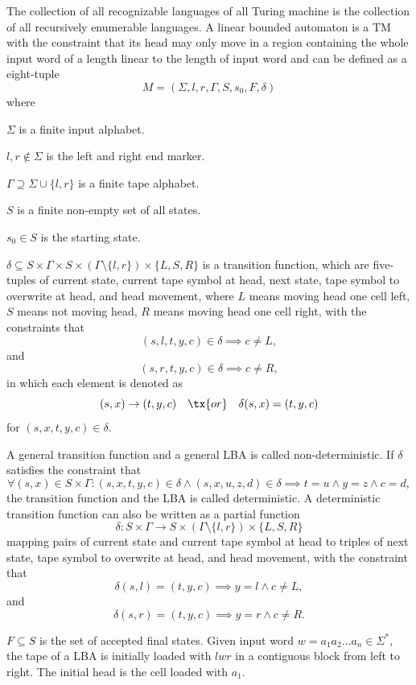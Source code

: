 \documentclass[a4paper,12pt]{article}
\begin{document}
 The collection of all recognizable languages of all Turing machine is the collection of all recursively enumerable languages.
A linear bounded automaton is a TM with the constraint that its head may only move in a region containing the whole input word of a length linear to the length of input word and can be defined as a eight-tuple
\[M=(\Sigma,l,r,\Gamma,S,s_0,F,\delta)\]
where
\bit
\item $\Sigma$ is a finite input alphabet.
\item $l,r\notin\Sigma$ is the left and right end marker.
\item $\Gamma\supseteq\Sigma\cup\{l,r\}$ is a finite tape alphabet.
\item $S$ is a finite non-empty set of all states.
\item $s_0\in S$ is the starting state.
\item $\delta\subseteq S\times\Gamma\times S\times(\Gamma\setminus\{l,r\})\times\{L,S,R\}$ is a transition function, which are five-tuples of current state, current tape symbol at head, next state, tape symbol to overwrite at head, and head movement, where $L$ means moving head one cell left, $S$ means not moving head, $R$ means moving head one cell right, with the constraints that
\[(s,l,t,y,c)\in\delta\implies c\neq L,\]
and
\[(s,r,t,y,c)\in\delta\implies c\neq R,\]
in which each element is denoted as
\[(s,x)\to (t,y,c)\quad\tx{or}\quad\delta(s,x)=(t,y,c)\]
for $(s,x,t,y,c)\in\delta$.

A general transition function and a general LBA is called non-deterministic. If $\delta$ satisfies the constraint that
\[\forall (s,x)\in S\times\Gamma\colon(s,x,t,y,c)\in\delta\land(s,x,u,z,d)\in\delta\implies t=u\land y=z\land c=d,\]
the transition function and the LBA is called deterministic. A deterministic transition function can also be written as a partial function
\[\delta\colon S\times\Gamma\to S\times(\Gamma\setminus\{l,r\})\times\{L,S,R\}\]
mapping pairs of current state and current tape symbol at head to triples of next state, tape symbol to overwrite at head, and head movement, with the constraint that
\[\delta(s,l)=(t,y,c)\implies y=l\land c\neq L,\]
and
\[\delta(s,r)=(t,y,c)\implies y=r\land c\neq R.\]
\item $F\subseteq S$ is the set of accepted final states.
\eit
Given input word $w=a_1a_2\ldots a_n\in\Sigma^*$, the tape of a LBA is initially loaded with $lwr$ in a contiguous block from left to right. The initial head is the cell loaded with $a_1$.
\end{document}
